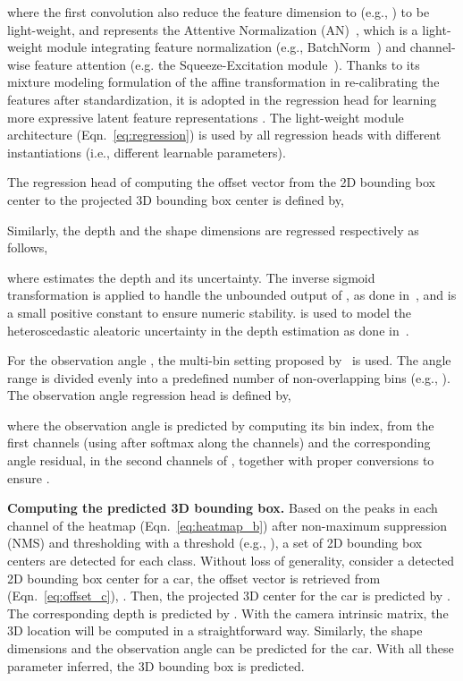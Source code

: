 \documentclass[letterpaper]{article} \usepackage{aaai22}  \usepackage{times}  \usepackage{helvet}  \usepackage{courier}  \usepackage[hyphens]{url}  \usepackage{graphicx} \urlstyle{rm} \def\UrlFont{\rm}  \usepackage{natbib}  \usepackage{caption} \DeclareCaptionStyle{ruled}{labelfont=normalfont,labelsep=colon,strut=off} \frenchspacing  \setlength{\pdfpagewidth}{8.5in}  \setlength{\pdfpageheight}{11in}  \usepackage{algorithm}
\begin{document}
where the first convolution also reduce the feature dimension to  (e.g., ) to be light-weight, and  represents the Attentive Normalization (AN)~\cite{an}, which is a light-weight module integrating feature normalization (e.g., BatchNorm~\cite{BatchNorm}) and channel-wise feature attention (e.g. the Squeeze-Excitation module~\cite{SE}).
Thanks to its mixture modeling formulation of the affine transformation in re-calibrating the features after standardization, it is adopted in the regression head for learning more expressive latent feature representations  . 
The light-weight module architecture  (Eqn.~\ref{eq:regression}) is used by all regression heads with different instantiations (i.e., different learnable  parameters).  

The regression head of computing the offset vector  from the 2D bounding box center  to the projected 3D bounding box center  is defined by, 


Similarly, the depth and the shape dimensions are regressed respectively as follows, 

where  estimates the depth and its uncertainty. The inverse sigmoid transformation is applied to handle the unbounded output of , as done in~\cite{centernet}, and  is a small positive constant to ensure numeric stability.  is used to model the heteroscedastic aleatoric uncertainty in the depth estimation as done in~\cite{monopair, monoflex, monodle}. 

For the observation angle , the multi-bin setting proposed by~\cite{deep3dbox} is used. The angle range  is divided evenly into a predefined number of  non-overlapping bins (e.g., ). The observation angle regression head is defined by, 

where the observation angle  is predicted by computing its bin index,  from the first  channels (using  after softmax along the  channels) and the corresponding angle residual,  in the second  channels of , together with proper conversions to ensure .



\textbf{Computing the predicted 3D bounding box.} Based on the peaks in each channel of the heatmap  (Eqn.~\ref{eq:heatmap_b}) after non-maximum suppression (NMS) and thresholding with a threshold  (e.g., ), a set of 2D bounding box centers are detected for each class. Without loss of generality, consider a detected 2D bounding box center  for a car, the offset vector is retrieved from  (Eqn.~\ref{eq:offset_c}), . Then, the projected 3D center for the car is predicted by . The corresponding depth is predicted by . With the camera intrinsic matrix, the 3D location  will be computed in a straightforward way. Similarly, the shape dimensions  and the observation angle  can be predicted for the car. With all these parameter inferred, the 3D bounding box is predicted.   
\end{document}
